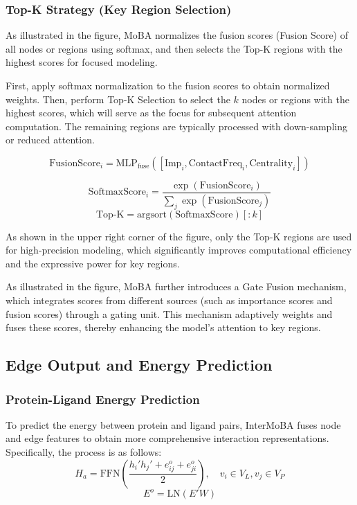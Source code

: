 \documentclass[lettersize,journal]{IEEEtran}
\begin{document}
\subsubsection{Top-K Strategy (Key Region Selection)}
As illustrated in the figure, MoBA normalizes the fusion scores (Fusion
Score) of all nodes or regions using softmax, and then selects the Top-K
regions with the highest scores for focused modeling.

First, apply softmax normalization to the fusion scores to
 obtain normalized weights.
Then, perform Top-K Selection to select the $k$ nodes or regions with
 the highest scores, which will serve as the focus for
 subsequent attention computation.
The remaining regions are typically processed with down-sampling or
 reduced attention.

\begin{equation}
\text{FusionScore}_i = \text{MLP}_{\text{fuse}}\left(\left[ \text{Imp}_i, \text{ContactFreq}_i, \text{Centrality}_i \right]\right)
\end{equation}

\begin{equation}
\text{SoftmaxScore}_i = \frac{\exp(\text{FusionScore}_i)}{\sum_j \exp(\text{FusionScore}_j)}
\end{equation}
\begin{equation}
\text{Top-K} = \text{argsort}(\text{SoftmaxScore})[:k]
\end{equation}

As shown in the upper right corner of the figure, only the Top-K regions
are used for high-precision modeling, which significantly improves
computational efficiency and the expressive power for key regions.

As illustrated in the figure, MoBA further introduces a Gate Fusion
mechanism, which integrates scores from different sources (such as
importance scores and fusion scores) through a gating unit. This
mechanism adaptively weights and fuses these scores, thereby enhancing
the model's attention to key regions.

\subsection{Edge Output and Energy Prediction}
\subsubsection{Protein-Ligand Energy Prediction}
To predict the energy between protein and ligand pairs, InterMoBA fuses
node and edge features to obtain more comprehensive
interaction representations. Specifically, the process is as follows:
\begin{equation}
H_{a} = \text{FFN}\left( \frac{h_{i}'h_{j}' + e_{ij}^{o} + e_{ji}^{o}}{2} \right), \quad v_{i} \in V_{L}, v_{j} \in V_{P}
\end{equation}
\begin{equation}
E^{o} = \text{LN}\left( E'W \right)
\end{equation}
\end{document}

